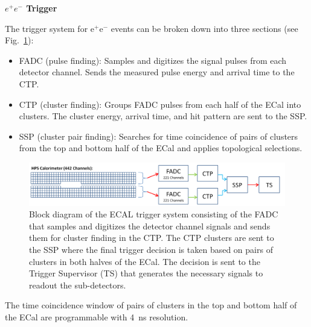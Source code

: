 


\vspace{1cm}
{\bf $e^+e^-$ Trigger} 


The trigger system for e$^+$e$^-$ events can be broken down into three sections (see Fig.~\ref{fig:hps_trigger_cal}):
 \begin{itemize}
 \item FADC (pulse finding): Samples and digitizes the signal pulses from each detector channel. Sends the measured pulse energy and arrival time to the CTP.
\item CTP (cluster finding): Groups FADC pulses from each half of the ECal into clusters. The cluster energy, arrival time, and hit pattern are sent to the SSP.
 \item SSP (cluster pair finding): Searches for time coincidence of pairs of clusters from the top and bottom half of the ECal and applies topological selections.
\end{itemize}
 \begin{figure}[t]
 \includegraphics[scale=0.25]{daq_trigger/figures/hps_trigger_cal}
\caption{\small{Block diagram of the ECAL trigger system consisting of the FADC that samples and digitizes the detector channel signals and sends them for cluster finding in the CTP. The CTP clusters are sent to the SSP where the final trigger decision is taken based on pairs of clusters in both halves of the ECal. The decision is sent to the Trigger Supervisor (TS) that generates the necessary signals to readout the sub-detectors.}}
 \label{fig:hps_trigger_cal}
 \end{figure}
The time coincidence window of pairs of clusters in the top and bottom half of the ECal are programmable with 4~ns resolution. 
